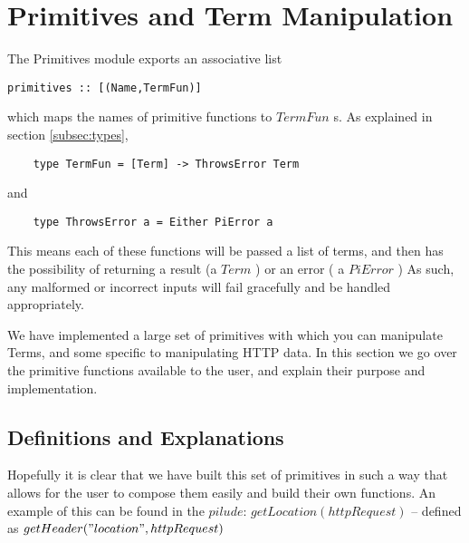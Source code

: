 \section{Primitives and Term Manipulation}
\label{sec:primitives}

The Primitives module exports an associative list 
\begin{verbatim}
primitives :: [(Name,TermFun)]
\end{verbatim}
which maps the names of primitive functions to $TermFun$ s. As explained in section \ref{subsec:types}, 
\begin{verbatim}
    type TermFun = [Term] -> ThrowsError Term
\end{verbatim}
and
\begin{verbatim}
    type ThrowsError a = Either PiError a
\end{verbatim}
This means each of these functions will be passed a list of terms, and then has the possibility of returning a result (a $Term$ ) or an error ( a $PiError$ )
As such, any malformed or incorrect inputs will fail gracefully and be handled appropriately.

We have implemented a large set of primitives with which you can manipulate Terms, and some specific to manipulating HTTP data. In this section we go over the primitive functions available to the user, and explain their purpose and implementation.
 
\subsection{Definitions and Explanations}



Hopefully it is clear that we have built this set of primitives in such a way that allows for the user to compose them easily and build their own functions. An example of this can be found in the $pilude$: $getLocation(httpRequest)$ -- defined as $getHeader("location",httpRequest)$
